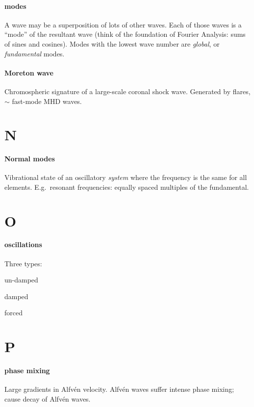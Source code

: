 \documentclass[12pt]{article}
\begin{document}
\paragraph{modes}
A wave may be a superposition of lots of other waves. Each of those
waves is a ``mode'' of the resultant wave (think of the foundation
of Fourier Analysis: sums of sines and cosines).
Modes with the lowest wave number are \emph{global}, or
\emph{fundamental} modes.

\paragraph{Moreton wave}
Chromospheric signature of a large-scale coronal shock wave. Generated
by flares, $\sim$ fast-mode MHD waves.

\section*{N}
\paragraph{Normal modes}
Vibrational state of an oscillatory \emph{system} where the frequency
is the same for all elements. E.g.\ resonant frequencies: equally
spaced multiples of the fundamental.

\section*{O}
\paragraph{oscillations}
Three types:
\begin{enumerate*}
    \item un-damped
    \item damped
    \item forced
\end{enumerate*}

\section*{P}

\paragraph{phase mixing}
Large gradients in Alfv\'en velocity. Alfv\'en waves suffer intense
phase mixing; cause decay of Alfv\'en waves.
\end{document}
